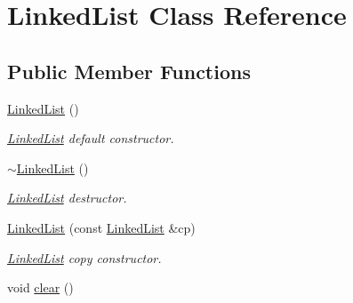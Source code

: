 \hypertarget{class_linked_list}{\section{Linked\-List Class Reference}
\label{class_linked_list}
}
\subsection*{Public Member Functions}
\begin{DoxyCompactItemize}
\item 
\hypertarget{class_linked_list_afe7f78983e173f8018927cf2ad11a5aa}{\hyperlink{class_linked_list_afe7f78983e173f8018927cf2ad11a5aa}{Linked\-List} ()}\label{class_linked_list_afe7f78983e173f8018927cf2ad11a5aa}

\begin{DoxyCompactList}\small\item\em \hyperlink{class_linked_list}{Linked\-List} default constructor. \end{DoxyCompactList}\item 
\hypertarget{class_linked_list_a35811ed58ff0d8d9cc9b309b8d8f5111}{\hyperlink{class_linked_list_a35811ed58ff0d8d9cc9b309b8d8f5111}{$\sim$\-Linked\-List} ()}\label{class_linked_list_a35811ed58ff0d8d9cc9b309b8d8f5111}

\begin{DoxyCompactList}\small\item\em \hyperlink{class_linked_list}{Linked\-List} destructor. \end{DoxyCompactList}\item 
\hyperlink{class_linked_list_ab34de0df2c51416dc15596f45809842b}{Linked\-List} (const \hyperlink{class_linked_list}{Linked\-List} \&cp)
\begin{DoxyCompactList}\small\item\em \hyperlink{class_linked_list}{Linked\-List} copy constructor. \end{DoxyCompactList}\item 
\hypertarget{class_linked_list_a261977565e78dd74f288d47ba5865242}{void \hyperlink{class_linked_list_a261977565e78dd74f288d47ba5865242}{clear} ()}\label{class_linked_list_a261977565e78dd74f288d47ba5865242}


\end{DoxyCompactItemize}
